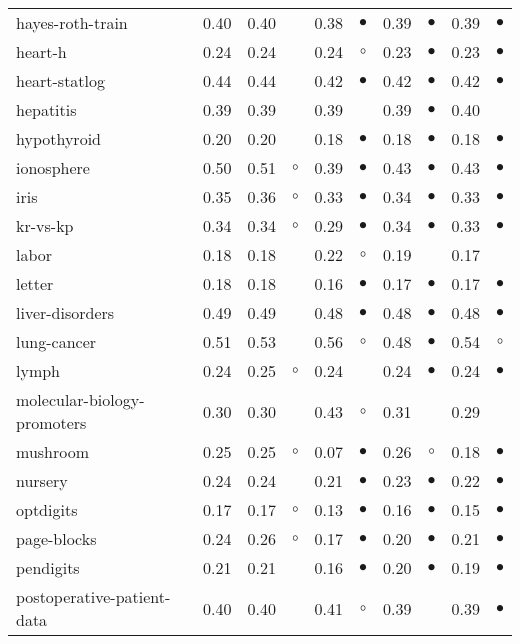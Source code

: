 \begin{table}[thb]
{\begin{tabular}{lrr@{\hspace{0.1cm}}cr@{\hspace{0.1cm}}cr@{\hspace{0.1cm}}cr@{\hspace{0.1cm}}c}
hayes-roth-train & 0.40 & 0.40 &           & 0.38 & $\bullet$ & 0.39 & $\bullet$ & 0.39 & $\bullet$\\
heart-h & 0.24 & 0.24 &           & 0.24 &   $\circ$ & 0.23 & $\bullet$ & 0.23 & $\bullet$\\
heart-statlog & 0.44 & 0.44 &           & 0.42 & $\bullet$ & 0.42 & $\bullet$ & 0.42 & $\bullet$\\
hepatitis & 0.39 & 0.39 &           & 0.39 &           & 0.39 & $\bullet$ & 0.40 &          \\
hypothyroid & 0.20 & 0.20 &           & 0.18 & $\bullet$ & 0.18 & $\bullet$ & 0.18 & $\bullet$\\
ionosphere & 0.50 & 0.51 &   $\circ$ & 0.39 & $\bullet$ & 0.43 & $\bullet$ & 0.43 & $\bullet$\\
iris & 0.35 & 0.36 &   $\circ$ & 0.33 & $\bullet$ & 0.34 & $\bullet$ & 0.33 & $\bullet$\\
kr-vs-kp & 0.34 & 0.34 &   $\circ$ & 0.29 & $\bullet$ & 0.34 & $\bullet$ & 0.33 & $\bullet$\\
labor & 0.18 & 0.18 &           & 0.22 &   $\circ$ & 0.19 &           & 0.17 &          \\
letter & 0.18 & 0.18 &           & 0.16 & $\bullet$ & 0.17 & $\bullet$ & 0.17 & $\bullet$\\
liver-disorders & 0.49 & 0.49 &           & 0.48 & $\bullet$ & 0.48 & $\bullet$ & 0.48 & $\bullet$\\
lung-cancer & 0.51 & 0.53 &           & 0.56 &   $\circ$ & 0.48 & $\bullet$ & 0.54 &   $\circ$\\
lymph & 0.24 & 0.25 &   $\circ$ & 0.24 &           & 0.24 & $\bullet$ & 0.24 & $\bullet$\\
molecular-biology-promoters & 0.30 & 0.30 &           & 0.43 &   $\circ$ & 0.31 &           & 0.29 &          \\
mushroom & 0.25 & 0.25 &   $\circ$ & 0.07 & $\bullet$ & 0.26 &   $\circ$ & 0.18 & $\bullet$\\
nursery & 0.24 & 0.24 &           & 0.21 & $\bullet$ & 0.23 & $\bullet$ & 0.22 & $\bullet$\\
optdigits & 0.17 & 0.17 &   $\circ$ & 0.13 & $\bullet$ & 0.16 & $\bullet$ & 0.15 & $\bullet$\\
page-blocks & 0.24 & 0.26 &   $\circ$ & 0.17 & $\bullet$ & 0.20 & $\bullet$ & 0.21 & $\bullet$\\
pendigits & 0.21 & 0.21 &           & 0.16 & $\bullet$ & 0.20 & $\bullet$ & 0.19 & $\bullet$\\
postoperative-patient-data & 0.40 & 0.40 &           & 0.41 &   $\circ$ & 0.39 &           & 0.39 & $\bullet$\\

\end{tabular}}
\end{table}
